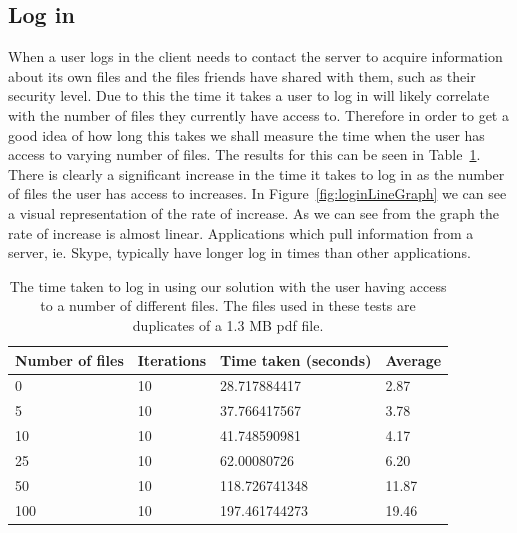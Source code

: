 \documentclass[12pt, titlepage]{article}
\begin{document}
\subsection{Log in}
When a user logs in the client needs to contact the server to acquire information about its own files and the files friends have shared with them, such as their security level. Due to this the time it takes a user to log in will likely correlate with the number of files they currently have access to. Therefore in order to get a good idea of how long this takes we shall measure the time when the user has access to varying number of files. The results for this can be seen in Table~\ref{tab:loginBenchmark}.
\newline \indent There is clearly a significant increase in the time it takes to log in as the number of files the user has access to increases. In Figure~\ref{fig:loginLineGraph} we can see a visual representation of the rate of increase. As we can see from the graph the rate of increase is almost linear.
\newline \indent Applications which pull information from a server, ie. Skype, typically have longer log in times than other applications.

\begin{table}[h]
	\begin{center}
    	\begin{tabular}{ | l | l | l | l |}
    \hline
    \textbf{Number of files} & \textbf{Iterations} & \textbf{Time taken 		(seconds)} & \textbf{Average} \\ \hline
    
    0  & 10 & 28.717884417 & 2.87 \\ \hline
    5  & 10 & 37.766417567 & 3.78 \\ \hline
    10 & 10 & 41.748590981 & 4.17 \\ \hline
    25 & 10 & 62.00080726 & 6.20 \\ \hline
    50 & 10 & 118.726741348 & 11.87 \\ \hline
    100 & 10 & 197.461744273 & 19.46 \\ \hline
    
    \end{tabular}
    \caption{The time taken to log in using our solution with the user having access to a number of different files. The files used in these tests are duplicates of a 1.3 MB pdf file.}
    \label{tab:loginBenchmark}
   \end{center}
\end{table}
    
\end{document}
